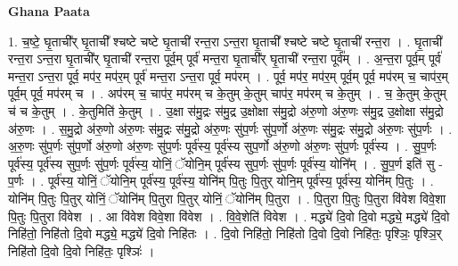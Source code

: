 \documentclass[17pt]{extarticle}
\begin{document}
\textbf{Ghana Paata } \newline

1. च॒ष्टे॒ घृ॒ताची᳚र् घृ॒ताची᳚ श्चष्टे चष्टे घृ॒ताची॑ रन्त॒रा ऽन्त॒रा घृ॒ताची᳚ श्चष्टे चष्टे घृ॒ताची॑ रन्त॒रा । . घृ॒ताची॑ रन्त॒रा ऽन्त॒रा घृ॒ताची᳚र् घृ॒ताची॑ रन्त॒रा पूर्व॒म् पूर्व॑ मन्त॒रा घृ॒ताची᳚र् घृ॒ताची॑ रन्त॒रा पूर्व᳚म् । . अ॒न्त॒रा पूर्व॒म् पूर्व॑ मन्त॒रा ऽन्त॒रा पूर्व॒ मप॑र॒ मप॑र॒म् पूर्व॑ मन्त॒रा ऽन्त॒रा पूर्व॒ मप॑रम् । . पूर्व॒ मप॑र॒ मप॑र॒म् पूर्व॒म् पूर्व॒ मप॑रम् च॒ चाप॑र॒म् पूर्व॒म् पूर्व॒ मप॑रम् च । . अप॑रम् च॒ चाप॑र॒ मप॑रम् च के॒तुम् के॒तुम् चाप॑र॒ मप॑रम् च के॒तुम् । . च॒ के॒तुम् के॒तुम् च॑ च के॒तुम् । . के॒तुमिति॑ के॒तुम् । . उ॒क्षा स॑मु॒द्रः स॑मु॒द्र उ॒क्षोक्षा स॑मु॒द्रो अ॑रु॒णो अ॑रु॒णः स॑मु॒द्र उ॒क्षोक्षा स॑मु॒द्रो अ॑रु॒णः । . स॒मु॒द्रो अ॑रु॒णो अ॑रु॒णः स॑मु॒द्रः स॑मु॒द्रो अ॑रु॒णः सु॑प॒र्णः सु॑प॒र्णो अ॑रु॒णः स॑मु॒द्रः स॑मु॒द्रो अ॑रु॒णः सु॑प॒र्णः । . अ॒रु॒णः सु॑प॒र्णः सु॑प॒र्णो अ॑रु॒णो अ॑रु॒णः सु॑प॒र्णः पूर्व॑स्य॒ पूर्व॑स्य सुप॒र्णो अ॑रु॒णो अ॑रु॒णः सु॑प॒र्णः पूर्व॑स्य । . सु॒प॒र्णः पूर्व॑स्य॒ पूर्व॑स्य सुप॒र्णः सु॑प॒र्णः पूर्व॑स्य॒ योनिं॒ ॅयोनि॒म् पूर्व॑स्य सुप॒र्णः सु॑प॒र्णः पूर्व॑स्य॒ योनि᳚म् । . सु॒प॒र्ण इति॑ सु - प॒र्णः । . पूर्व॑स्य॒ योनिं॒ ॅयोनि॒म् पूर्व॑स्य॒ पूर्व॑स्य॒ योनि॑म् पि॒तुः पि॒तुर् योनि॒म् पूर्व॑स्य॒ पूर्व॑स्य॒ योनि॑म् पि॒तुः । . योनि॑म् पि॒तुः पि॒तुर् योनिं॒ ॅयोनि॑म् पि॒तुरा पि॒तुर् योनिं॒ ॅयोनि॑म् पि॒तुरा । . पि॒तुरा पि॒तुः पि॒तुरा वि॑वेश विवे॒शा पि॒तुः पि॒तुरा वि॑वेश । . आ वि॑वेश विवे॒शा वि॑वेश । . वि॒वे॒शेति॑ विवेश । . मद्ध्ये॑ दि॒वो दि॒वो मद्ध्ये॒ मद्ध्ये॑ दि॒वो निहि॑तो॒ निहि॑तो दि॒वो मद्ध्ये॒ मद्ध्ये॑ दि॒वो निहि॑तः । . दि॒वो निहि॑तो॒ निहि॑तो दि॒वो दि॒वो निहि॑तः॒ पृश्ञिः॒ पृश्ञि॒र् निहि॑तो दि॒वो दि॒वो निहि॑तः॒ पृश्ञिः॑ । \newline
\end{document}
